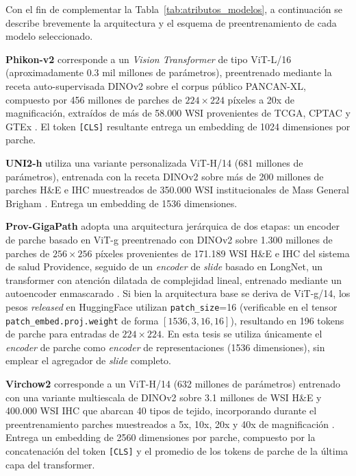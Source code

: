Con el fin de complementar la Tabla~\ref{tab:atributos_modelos},
a continuación se describe brevemente la arquitectura y el
esquema de preentrenamiento de cada modelo seleccionado.

\textbf{Phikon-v2} corresponde a un \textit{Vision Transformer} de tipo ViT-L/16
(aproximadamente 0.3 mil millones de parámetros), preentrenado mediante la receta
auto-supervisada DINOv2 sobre el corpus público PANCAN-XL, compuesto por 456
millones de parches de $224\times224$ píxeles a 20x de magnificación, extraídos de
más de 58.000 WSI provenientes de TCGA, CPTAC y GTEx \citep{filiot2024phikonv2}.
El token \texttt{[CLS]} resultante entrega un embedding de 1024 dimensiones por parche.

\textbf{UNI2-h} utiliza una variante personalizada ViT-H/14 (681 millones de
parámetros), entrenada con la receta DINOv2 sobre más de 200 millones de parches
H\&E e IHC muestreados de 350.000 WSI institucionales de Mass General Brigham
\citep{chen2024uni}. Entrega un embedding de 1536 dimensiones.

\textbf{Prov-GigaPath} adopta una arquitectura jerárquica de dos etapas: un
encoder de parche basado en ViT-g preentrenado con DINOv2 sobre 1.300 millones de
parches de $256\times256$ píxeles provenientes de 171.189 WSI H\&E e IHC del
sistema de salud Providence, seguido de un \textit{encoder} de \textit{slide} basado en
LongNet, un transformer con atención dilatada de complejidad lineal, entrenado
mediante un autoencoder enmascarado \citep{xu2024provgigapath}. Si bien la
arquitectura base se deriva de ViT-g/14, los pesos \textit{released} en
HuggingFace utilizan \texttt{patch\_size}=16 (verificable en el tensor
\texttt{patch\_embed.proj.weight} de forma $[1536, 3, 16, 16]$), resultando en
196 tokens de parche para entradas de $224\times224$. En esta tesis se
utiliza únicamente el \textit{encoder} de parche como \textit{encoder} de representaciones
(1536 dimensiones), sin emplear el agregador de \textit{slide} completo.

\textbf{Virchow2} corresponde a un ViT-H/14 (632 millones de parámetros)
entrenado con una variante multiescala de DINOv2 sobre 3.1 millones de WSI
H\&E y 400.000 WSI IHC que abarcan 40 tipos de tejido, incorporando durante el
preentrenamiento parches muestreados a 5x, 10x, 20x y 40x de magnificación
\citep{vorontsov2024virchow}. Entrega un embedding de 2560 dimensiones por parche, compuesto por la
concatenación del token \texttt{[CLS]} y el promedio de los tokens de parche
de la última capa del transformer.

